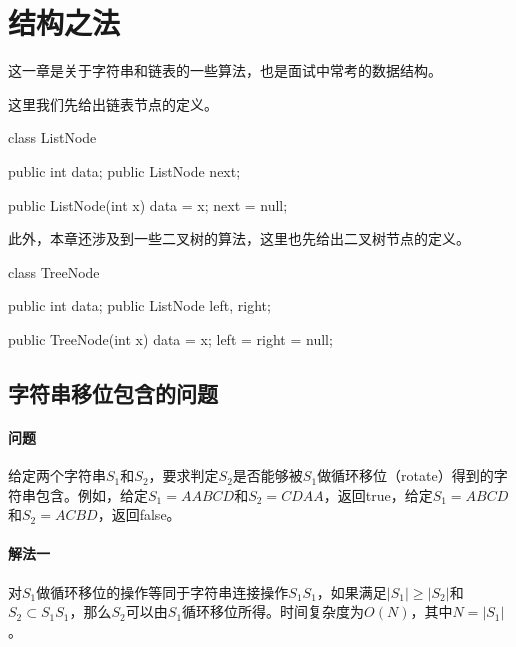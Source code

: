 \chapter{结构之法}

这一章是关于字符串和链表的一些算法，也是面试中常考的数据结构。

这里我们先给出链表节点的定义。

\begin{Codex}[label={ListNode.java}]
class ListNode {
	public int data;
	public ListNode next;
	
	public ListNode(int x) {
		data = x;
		next = null;
	}
}
\end{Codex}

此外，本章还涉及到一些二叉树的算法，这里也先给出二叉树节点的定义。
\begin{Codex}[label={TreeNode.java}]
class TreeNode {
	public int data;
	public ListNode left, right;
	
	public TreeNode(int x) {
		data = x;
		left = right = null;
	}
}
\end{Codex}


\section{字符串移位包含的问题} %
\label{sec:string-shift-search}


\subsubsection{问题}
给定两个字符串$S_1$和$S_2$，要求判定$S_2$是否能够被$S_1$做循环移位（rotate）得到的字符串包含。例如，给定$S_1=AABCD$和$S_2=CDAA$，返回true，给定$S_1=ABCD$和$S_2=ACBD$，返回false。


\subsubsection{解法一}
对$S_1$做循环移位的操作等同于字符串连接操作$S_1S_1$，如果满足$|S_1|\geq|S_2|$和$S_2\subset S_1S_1$，那么$S_2$可以由$S_1$循环移位所得。时间复杂度为$O(N)$，其中$N=|S_1|$。

